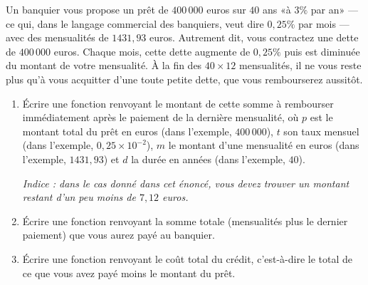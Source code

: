\question Un banquier vous  propose un prêt de $400\,000$ euros  sur $40$ ans «à
$3\%$ par  an» ---  ce qui, dans  le langage commercial  des banquiers,
veut  dire $0,25\%$  par mois  ---  avec des  mensualités de  $1431,93$
euros.  Autrement  dit,  vous   contractez  une  dette  de  $400\,000$
euros. Chaque mois, cette dette  augmente de $0,25\%$ puis est diminuée
du  montant  de  votre  mensualité.  À  la  fin  des  $40  \times  12$
mensualités, il  ne vous  reste plus qu'à  vous acquitter  d'une toute
petite dette, que vous rembourserez aussitôt.
\begin{enumerate}[label=\emph{\alph*)}]
  \item Écrire  une fonction  
renvoyant  le montant  de cette  somme à  rembourser  immédiatement
après le paiement de la dernière
mensualité, où  $p$ est le  montant total du  prêt en euros (dans l'exemple, $400\,000$), $t$ son  taux mensuel (dans l'exemple, 
$0,25 \times 10^{-2}$), $m$ le montant d'une mensualité en euros (dans l'exemple, $1431,93$) et $d$ la
durée en années (dans l'exemple, $40$).

\emph{Indice : dans le cas donné dans cet énoncé, vous devez trouver un montant
restant d'un peu moins de $7,12$ euros.}
  \item Écrire une fonction  renvoyant la somme totale (mensualités plus le dernier
paiement) que vous aurez payé au banquier.
  \item Écrire une fonction  renvoyant
  le coût total  du crédit, c'est-à-dire le total de  ce que vous avez
  payé moins le montant du prêt.
\end{enumerate}